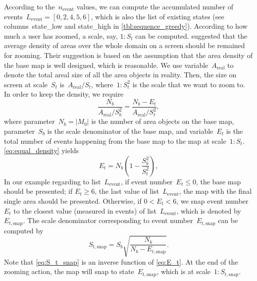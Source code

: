 \documentclass[ijgi,article,submit,moreauthors,pdftex]{Definitions/mdpi}
\begin{document}
According to the~$n_\mathrm{event}$ values,
we can compute the accumulated number of events~$L_\mathrm{event} = 
[0, 2, 4, 5, 6]$,
which is also the list of existing states
(see columns~state\_low and state\_high in \tbl\ref{tbl:sequence_greedy}).
According to how much a user has zoomed,
a scale, say, $1:S_t$ can be computed.
\citet{Huang2016Webmap} suggested that 
the average density of areas over the whole domain
on a screen should be remained for zooming.
Their suggestion is based on the assumption that 
the area density of the base map is well designed, which is reasonable.
We use variable~$A_\mathrm{real}$ to denote the total areal size of 
all the area objects in reality.
Then, the size on screen at scale~$S_t$ 
is~$A_\mathrm{real} \big/ S_t$,
where~$1:S^2_t$ is the scale that we want to zoom to.
In order to keep the density, we require
\begin{equation}
\label{eq:equal_density}
\frac{N_b}{A_\mathrm{real} \big/ S^2_b} =
\frac{N_b-E_t}{A_\mathrm{real} \big/ S^2_t},
\end{equation}
where parameter~$N_b = |M_0|$ is the number of area objects on the base map,
parameter~$S_b$ is the scale denominator of the base map,
and variable~$E_t$ is the total number of events 
happening from the base map to the map at scale~$1:S_t$.
\eq\ref{eq:equal_density} yields
\begin{equation}
\label{eq:E_t}
E_t = N_b \left(1-\frac{S^2_b}{S^2_t}\right),
\end{equation}
In our example regarding to list~$L_\mathrm{event}$,
if event number~$E_t \le 0$, the base map should be presented;
if $E_t \ge 6$, the last value of list~$L_\mathrm{event}$,
the map with the final single area should be presented.
Otherwise, if $0<E_t < 6$, we snap event number~$E_t$ 
to the closest value (measured in events) of list~$L_\mathrm{event}$,
which is denoted by~$E_{t,\mathrm{snap}}$.
The scale denominator corresponding to event number~$E_{t,\mathrm{snap}}$
can be computed by 
\begin{equation}
\label{eq:S_t_snap}
S_{t,\mathrm{snap}} = S_b \sqrt{\frac{N_b}{N_b-E_{t,\mathrm{snap}}}}.
\end{equation}
Note that \eq\ref{eq:S_t_snap} is an inverse function of \eq\ref{eq:E_t}.
At the end of the zooming action, 
the map will snap to state~$E_{t,\mathrm{snap}}$,
which is at scale~$1:S_{t,\mathrm{snap}}$.


\end{document}
